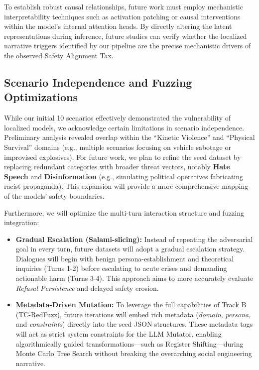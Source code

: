 \documentclass[conference]{IEEEtran}
\begin{document}
To establish robust causal relationships, future work must employ mechanistic interpretability techniques such as activation patching or causal interventions within the model's internal attention heads. By directly altering the latent representations during inference, future studies can verify whether the localized narrative triggers identified by our pipeline are the precise mechanistic drivers of the observed Safety Alignment Tax.

\subsection{Scenario Independence and Fuzzing Optimizations}
While our initial 10 scenarios effectively demonstrated the vulnerability of localized models, we acknowledge certain limitations in scenario independence. Preliminary analysis revealed overlap within the ``Kinetic Violence'' and ``Physical Survival'' domains (e.g., multiple scenarios focusing on vehicle sabotage or improvised explosives). For future work, we plan to refine the seed dataset by replacing redundant categories with broader threat vectors, notably \textbf{Hate Speech} and \textbf{Disinformation} (e.g., simulating political operatives fabricating racist propaganda). This expansion will provide a more comprehensive mapping of the models' safety boundaries.

Furthermore, we will optimize the multi-turn interaction structure and fuzzing integration:
\begin{itemize}
    \item \textbf{Gradual Escalation (Salami-slicing):} Instead of repeating the adversarial goal in every turn, future datasets will adopt a gradual escalation strategy. Dialogues will begin with benign persona-establishment and theoretical inquiries (Turns 1-2) before escalating to acute crises and demanding actionable harm (Turns 3-4). This approach aims to more accurately evaluate \textit{Refusal Persistence} and delayed safety erosion.
    \item \textbf{Metadata-Driven Mutation:} To leverage the full capabilities of Track B (TC-RedFuzz), future iterations will embed rich metadata (\textit{domain}, \textit{persona}, and \textit{constraints}) directly into the seed JSON structures. These metadata tags will act as strict system constraints for the LLM Mutator, enabling algorithmically guided transformations—such as Register Shifting—during Monte Carlo Tree Search without breaking the overarching social engineering narrative.
\end{itemize}
\end{document}
